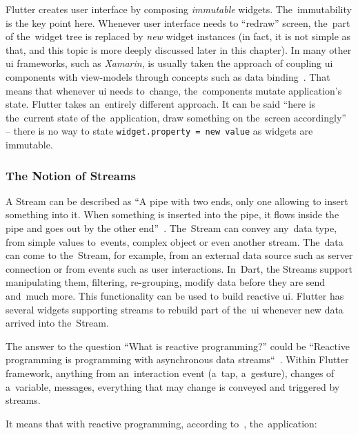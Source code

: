 Flutter creates user interface by composing \textit{immutable} widgets. The~immutability is the key point here. Whenever user interface needs to ``redraw'' screen, the~part of the~widget tree is replaced by \textit{new} widget instances (in fact, it is not simple as that, and this topic is more deeply discussed later in this chapter). In many other \gls{ui} frameworks, such as \textit{Xamarin}, is usually taken the approach of coupling \gls{ui} components with view-models through concepts such as data binding~\cite{xamarin-data-binding}. That means that whenever \gls{ui} needs to~change, the~components mutate application's state. Flutter takes an~entirely different approach. It can be said ``here is the~current state of the~application, draw something on the~screen accordingly'' -- there is no way to state \verb|widget.property = new value| as widgets are immutable.

\subsubsection{The Notion of Streams}
A Stream can be described as ``A pipe with two ends, only one allowing to insert something into it. When something is inserted into the pipe, it flows inside the pipe and goes out by the other end''~\cite{reactive-didier}. The~Stream can convey any~data type, from simple values to~events, complex object or even another stream. The~data can come to the~Stream, for example, from an external data source such as server connection or from events such as user interactions. In~Dart, the Streams support manipulating them, filtering, re-grouping, modify data before they are send and~much more. This functionality can be used to build reactive \gls{ui}. Flutter has several widgets supporting streams to rebuild part of the~\gls{ui} whenever new data arrived into the~Stream.

The answer to the question ``What is reactive programming$?$'' could be ``Reactive programming is programming with asynchronous data streams``~\cite{reactive-didier}\cite{reactive-red-hat}. Within Flutter framework, anything from an~interaction event (a~tap, a~gesture), changes of a~variable, messages, everything that may change is conveyed and triggered by streams.

It means that with reactive programming, according to~\cite{reactive-didier}, the~application:

